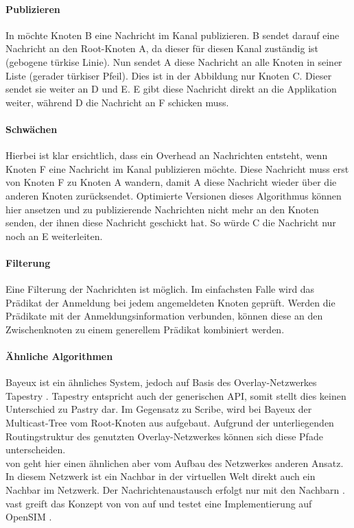 \paragraph*{Publizieren}
In  möchte Knoten B eine Nachricht im Kanal publizieren. B sendet darauf eine Nachricht an den Root-Knoten A, da dieser für diesen Kanal zuständig ist (gebogene türkise Linie). Nun sendet A diese Nachricht an alle Knoten in seiner Liste (gerader türkiser Pfeil). Dies ist in der Abbildung nur Knoten C. Dieser sendet sie weiter an D und E. E gibt diese Nachricht direkt an die Applikation weiter, während D die Nachricht an F schicken muss.


\paragraph*{Schwächen}
Hierbei ist klar ersichtlich, dass ein Overhead an Nachrichten entsteht, wenn Knoten F eine Nachricht im Kanal publizieren möchte. Diese Nachricht muss erst von Knoten F zu Knoten A wandern, damit A diese Nachricht wieder über die anderen Knoten zurücksendet. Optimierte Versionen dieses Algorithmus können hier ansetzen und zu publizierende Nachrichten nicht mehr an den Knoten senden, der ihnen diese Nachricht geschickt hat. So würde C die Nachricht nur noch an E weiterleiten.

\paragraph*{Filterung}
Eine Filterung der Nachrichten ist möglich. Im einfachsten Falle wird das Prädikat der Anmeldung bei jedem angemeldeten Knoten geprüft. Werden die Prädikate mit der Anmeldungsinformation verbunden, können diese an den Zwischenknoten zu einem generellem Prädikat kombiniert werden.

\paragraph*{Ähnliche Algorithmen}
Bayeux \cite{Zhuang2001} ist ein ähnliches System, jedoch auf Basis des Overlay-Netzwerkes Tapestry \cite{Zhao2004Tapestry}. Tapestry entspricht auch der generischen API, somit stellt dies keinen Unterschied zu Pastry dar. Im Gegensatz zu Scribe, wird bei Bayeux der Multicast-Tree vom Root-Knoten aus aufgebaut. Aufgrund der unterliegenden Routingstruktur des genutzten Overlay-Netzwerkes können sich diese Pfade unterscheiden.\\
\ac{von} geht hier einen ähnlichen aber vom Aufbau des Netzwerkes anderen Ansatz. In diesem Netzwerk ist ein Nachbar in der virtuellen Welt direkt auch ein Nachbar im Netzwerk. Der Nachrichtenaustausch erfolgt nur mit den Nachbarn \cite{Hu2006VON}. \ac{vast} \cite{Backhaus2007Voronoibased} greift das Konzept von \ac{von} auf und testet eine Implementierung auf OpenSIM \cite{Baumgart2007OverSim}.



